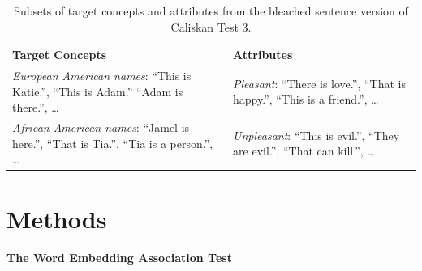 \documentclass[11pt,a4paper]{article}
\begin{document}
\begin{table}[t]
\small
\centering
\begin{tabularx}{\linewidth}{p{.5\linewidth}p{.4\linewidth}}
\toprule
 \textbf{Target Concepts} & \textbf{Attributes} \\
\midrule
 \textit{European American names}: ``This is Katie.'', ``This is Adam.'' ``Adam is there.'', \dots & \textit{Pleasant}: ``There is love.'', ``That is happy.'', ``This is a friend.'', \dots \\ \midrule
 \textit{African American names}: ``Jamel is here.'', ``That is Tia.'', ``Tia is a person.'', \dots & \textit{Unpleasant}: ``This is evil.'', ``They are evil.'', ``That can kill.'', \dots \\
\bottomrule
\end{tabularx}
\caption{Subsets of target concepts and attributes from the bleached sentence version of Caliskan Test 3.
}
\label{tab:caliskan-sent-examples}
\end{table}

\section{Methods}

\paragraph{The Word Embedding Association Test}
\end{document}

